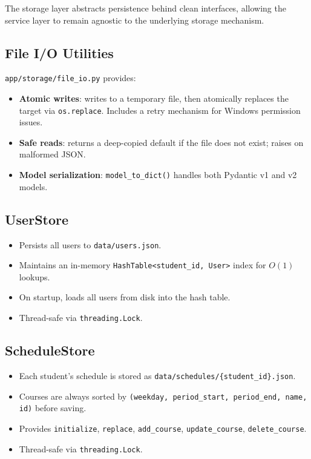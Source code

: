 \documentclass[12pt,a4paper]{article}
\begin{document}
The storage layer abstracts persistence behind clean interfaces, allowing the service layer to remain agnostic to the underlying storage mechanism.

\subsection{File I/O Utilities}

\texttt{app/storage/file\_io.py} provides:
\begin{itemize}[nosep]
    \item \textbf{Atomic writes}: writes to a temporary file, then atomically replaces the target via \texttt{os.replace}. Includes a retry mechanism for Windows permission issues.
    \item \textbf{Safe reads}: returns a deep-copied default if the file does not exist; raises on malformed JSON.
    \item \textbf{Model serialization}: \texttt{model\_to\_dict()} handles both Pydantic v1 and v2 models.
\end{itemize}

\subsection{UserStore}

\begin{itemize}[nosep]
    \item Persists all users to \texttt{data/users.json}.
    \item Maintains an in-memory \texttt{HashTable<student\_id, User>} index for $O(1)$ lookups.
    \item On startup, loads all users from disk into the hash table.
    \item Thread-safe via \texttt{threading.Lock}.
\end{itemize}

\subsection{ScheduleStore}

\begin{itemize}[nosep]
    \item Each student's schedule is stored as \texttt{data/schedules/\{student\_id\}.json}.
    \item Courses are always sorted by \texttt{(weekday, period\_start, period\_end, name, id)} before saving.
    \item Provides \texttt{initialize}, \texttt{replace}, \texttt{add\_course}, \texttt{update\_course}, \texttt{delete\_course}.
    \item Thread-safe via \texttt{threading.Lock}.
\end{itemize}
\end{document}
